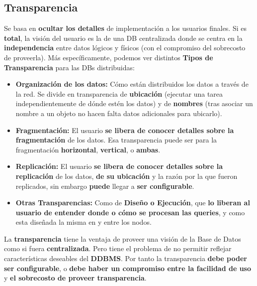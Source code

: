 \subsection*{Transparencia}
Se basa en \textbf{ocultar los detalles} de implementación a los usuarios finales. Si es \textbf{total}, la visión del usuario es la de una DB centralizada donde se centra en la \textbf{independencia} entre datos lógicos y físicos (con el compromiso del sobrecosto de proveerla). Más específicamente, podemos ver distintos \textbf{Tipos de Transparencia} para las DBs distribuidas:
\begin{itemize}
    \item \textbf{Organización de los datos:} Cómo están distribuidos los datos a través de la red. Se divide en transparencia de \textbf{ubicación} (ejecutar una tarea independientemente de dónde estén los datos) y de \textbf{nombres} (tras asociar un nombre a un objeto no hacen falta datos adicionales para ubicarlo).
    \item \textbf{Fragmentación:} El usuario \textbf{se libera de conocer detalles sobre la fragmentación} de los datos. Esa transparencia puede ser para la fragmentación \textbf{horizontal}, \textbf{vertical}, o \textbf{ambas}.
    \item \textbf{Replicación:} El usuario \textbf{se libera de conocer detalles sobre la replicación} de los datos, \textbf{de su ubicación} y la razón por la que fueron replicados, sin embargo \textbf{puede} llegar a \textbf{ser configurable}.
    \item \textbf{Otras Transparencias:} Como de \textbf{Diseño o Ejecución}, que \textbf{lo liberan al usuario de entender donde o cómo se procesan las queries}, y como esta diseñada la misma en y entre los nodos.
\end{itemize}

La \textbf{transparencia}  tiene la ventaja de proveer una visión de la Base de Datos como si fuera \textbf{centralizada}. Pero tiene el problema de no permitir reflejar características deseables del \textbf{DDBMS}.
Por tanto la transparencia \textbf{debe poder ser configurable}, o \textbf{debe haber un compromiso entre la facilidad de uso} y \textbf{el sobrecosto de proveer transparencia}.

